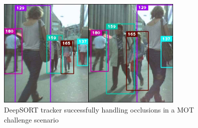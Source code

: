 \begin{figure}[ht]
    \centering
    \includegraphics[width=0.8\textwidth]{images/DeepSORT.jpg}
    \caption[DeepSORT Tracker example]{DeepSORT tracker successfully handling occlusions in a MOT challenge scenario}
    \label{fig:DeepSORT}
\end{figure}

